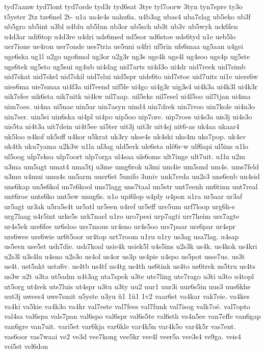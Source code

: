 tyd7aanw
tyd7lont
tyd7orde
tyd3r
tyd6sat
3tye
tyl7oorw
3tyn
tyn7spre
ty3o
t5yster
2tz
tze6nel
2t-
u1a
ua4e4s
uahu6a.
u4b3ag
ubas4
uba7slag
ub5eko
ub3f
ub5gro
ub5int
u3bl
u4blu
ub5lun
ub3or
ub5sch
ub3t
ub3v
ub5wyk
uck6len
u4d3ar
udi6top
u4d3re
u4dri
uds6med
ud5sor
ud6stoe
uds6tyd
u1e
ueb5lo
uer7ione
ue4ron
uer7onde
ues7tria
ue5uni
u4fri
uf5rin
ufs6maa
ug5aan
u4gei
uge6ska
ug1l
u2go
ugo6mol
ug3or
u2g3r
ug3s
ugs4k
ugs4l
ug4soo
ugs4p
ug5ste
ugs6tek
ug5sto
ug5sui
ug4ub
ui4dag
uid7arts
ui4d3o
ui4dr
uid7reek
uid7simb
uid7skat
uid7skel
uid7skil
uid7slui
uid5spr
uids6to
uid7stoe
uid7uits
ui1e
uiers6w
uies6ma
uie7smaa
ui4f3a
uif7eend
uif5le
ui4go
ui4g3r
uig3s4
ui4k3a
ui4k3l
ui4k3r
uik7sfee
uik6sta
uik7uitk
ui4kw
uil7aap.
uil5eks
uil7esel
ui4l5oo
uil7tjan
ui4ma
uim7oes.
ui4na
ui5nae
uin5ar
uin7asyn
uind4
uin7drek
uin7ivoo
uin7kole
ui4n3o
uin7ser.
uin5si
uin6ska
ui4pl
ui4po
uip5oo
uip7ore.
uip7roes
ui4s3a
uis3j
ui4s3o
uis5ta
ui4t3a
uit7dein
ui4t5ee
ui5ter
uit3j
uit3r
uit4sj
uit6-as
uk4aa
ukaar4
uk5loo
u4kof
uk5off
u4kor
u5krat
uk3ry
ukse4s
uk4ski
uks4m
uks7pop.
uk4sv
uk4th
uku7yama
u2k3w
u1la
ul3ag
uld5erk
ule6sta
ulê6r-w
ulf6api
ul5ins
u1lo
ul5oog
ulp7eksa
ulp7oort
ulp7orga
ul4saa
uls6oms
ult7inge
ult7uit.
u1lu
u2m
u3ma
um5agt
umat4
uma5tj
u3me
umg6rok
u3mi
um4ie
um5ond
um4s.
ums7feld
u3mu
u4mui
umu4s
un5arm
uner6st
5unifo
3univ
unk7reda
un2s3
uns6enb
un4sid
uns6kap
un5s6kol
un7s6kool
uns7lagg
uns7taal
un5str
unt7eenh
un6tinn
unt7real
unt6roe
unts6ko
unt5sw
unug6s.
u1o
upi6lop
u4ply
u4pon
u1ra
ur5aar
ur3af
ur5agt
ur3ak
u5ra5s4t
ur5atl
ur5een
u4ref
ur5eff
ure5um
urf7loop
urg6h-s
urg7laag
u4r5int
urke5s
urk7nael
u1ro
uro7pesi
urp7agti
urr7heim
urs7agte
ur4s5ek
urs6fee
ur6sloo
urs7mous
ur4sno
ur4s5oo
urs7paar
urs6par
ur4spr
urs6wee
urs6wie
ur6t5oor
ur4top
urt7room
u1ru
u1ry
us3ag
usa7lag.
u4sap
us5een
use5st
ush7die.
ush7koal
usie4k
usiek5l
u4s5ins
u2s3k
us4k.
us4kok
us4kri
u2s3l
u3s4lu
u4sno
u2s3o
us4ol
us4or
us3p
us4pie
u4spo
us5pot
usse7us.
us3t
us4t.
ust5akt
usta6v.
us4tb
us4tf
us4tg
us4th
us6tink
us4to
us6trek
us5tru
us4ts
us3w
u2t
u3ta
ut5adm
u4t3ag
uta7spek
u3te
ute7ling
ute7rago
u3ti
u3to
u4topl
ut5org
ut4rek
uts7luis
ut4spr
u3tu
u3ty
uu2
uur1
uur3i
uur6s5in
uus3
uus6khe
uut3j
uwees4
uwe7smit
u5yste
u3yu
û1
1ü1
1v2
vaar6st
va4kar
vak7eie.
va4kes
va4ki
va5kie
va4k3o
va4kr
val7este
val7fees
val7funk
val7isog
valk7oë.
val7opto
val4sa
val6spa
vals7pan
val6spo
val6spr
val6s5te
val6sth
va4n5ee
van7effe
van6gap
van6gre
van7uit.
vari5et
var6kja
var6kle
var4k5n
var4k5o
var4k5r
vas7ent.
vas6oor
vas7waai
ve2
ve3d
vee7kong
vee5kr
vee4l
veer5a
vee3s4
ve9ga.
veis4
vei5st
vel6don
